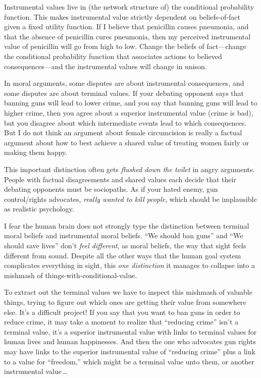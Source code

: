 {{
 Instrumental values live in (the network structure of) the
conditional probability function. This makes instrumental value
strictly dependent on beliefs-of-fact given a fixed utility function.
If I believe that penicillin causes pneumonia, and that the absence of
penicillin cures pneumonia, then my perceived instrumental value of
penicillin will go from high to low. Change the beliefs of
fact---change the conditional probability function that associates
actions to believed consequences---and the instrumental values will
change in unison.}

{
 In moral arguments, some disputes are about instrumental
consequences, and some disputes are about terminal values. If your
debating opponent says that banning guns will lead to lower crime, and
you say that banning guns will lead to higher crime, then you agree
about a superior instrumental value (crime is bad), but you disagree
about which intermediate events lead to which consequences. But I do
not think an argument about female circumcision is really a factual
argument about how to best achieve a shared value of treating women
fairly or making them happy.}

{
 This important distinction often gets \textit{flushed down the
toilet} in angry arguments. People with factual disagreements and
shared values each decide that their debating opponents must be
sociopaths. As if your hated enemy, gun control/rights advocates,
\textit{really wanted to kill people}, which should be implausible as
realistic psychology.}

{
 I fear the human brain does not strongly type the distinction
between terminal moral beliefs and instrumental moral beliefs.
``We should ban guns'' and
``We should save lives''
don't \textit{feel different}, as moral beliefs, the
way that sight feels different from sound. Despite all the other ways
that the human goal system complicates everything in sight, this
\textit{one distinction} it manages to collapse into a mishmash of
things-with-conditional-value.}

{
 To extract out the terminal values we have to inspect this
mishmash of valuable things, trying to figure out which ones are
getting their value from somewhere else. It's a
difficult project! If you say that you want to ban guns in order to
reduce crime, it may take a moment to realize that
``reducing crime''
isn't a terminal value, it's a superior
instrumental value with links to terminal values for human lives and
human happinesses. And then the one who advocates gun rights may have
links to the superior instrumental value of ``reducing
crime'' plus a link to a value for
``freedom,'' which might be a
terminal value unto them, or another instrumental value\,\ldots}

}
